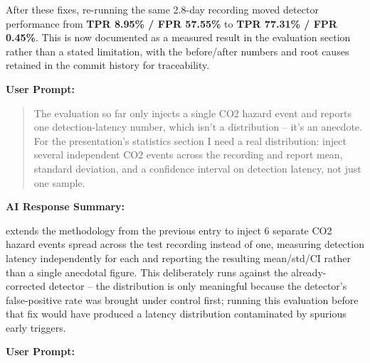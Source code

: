 \documentclass[conference]{IEEEtran}
\begin{document}
After these fixes, re-running the same 2.8-day recording moved detector performance from \textbf{TPR 8.95\% / FPR 57.55\%} to \textbf{TPR 77.31\% / FPR 0.45\%}. This is now documented as a measured result in the evaluation section rather than a stated limitation, with the before/after numbers and root causes retained in the commit history for traceability.

\par\vspace{4pt}\par\vspace{2pt}

\noindent\textbf{User Prompt:}\par

\begin{quote}
The evaluation so far only injects a single CO2 hazard event and reports one detection-latency number, which isn't a distribution -- it's an anecdote. For the presentation's statistics section I need a real distribution: inject several independent CO2 events across the recording and report mean, standard deviation, and a confidence interval on detection latency, not just one sample.
\end{quote}

\noindent\textbf{AI Response Summary:}\par

\texttt{} extends the \texttt{} methodology from the previous entry to inject 6 separate CO2 hazard events spread across the test recording instead of one, measuring detection latency independently for each and reporting the resulting mean/std/CI rather than a single anecdotal figure. This deliberately runs against the already-corrected detector -- the distribution is only meaningful because the detector's false-positive rate was brought under control first; running this evaluation before that fix would have produced a latency distribution contaminated by spurious early triggers.

\par\vspace{4pt}\par\vspace{2pt}

\noindent\textbf{User Prompt:}\par
\end{document}
